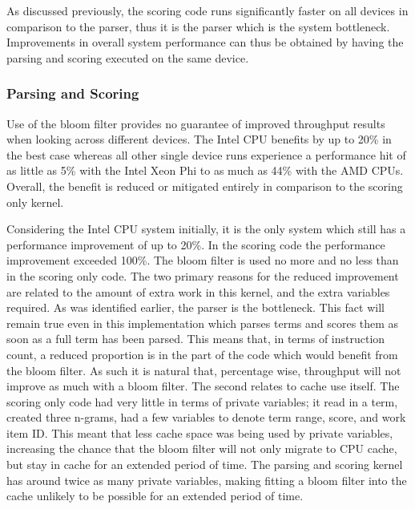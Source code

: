 As discussed previously, the scoring code runs significantly faster on all
devices in comparison to the parser, thus it is the parser which is the system
bottleneck. Improvements in overall system performance can thus be obtained by
having the parsing and scoring executed on the same device.

\subsubsection{Parsing and Scoring}

Use of the bloom filter provides no guarantee of improved throughput results
when looking across different devices. The Intel CPU benefits by up to 20\% in
the best case whereas all other single device runs experience a performance hit
of as little as 5\% with the Intel Xeon Phi to as much as 44\% with the AMD
CPUs. Overall, the benefit is reduced or mitigated entirely in comparison to the
scoring only kernel.

Considering the Intel CPU system initially, it is the only system which still
has a performance improvement of up to 20\%. In the scoring code the performance
improvement exceeded 100\%. The bloom filter is used no more and no less than in
the scoring only code. The two primary reasons for the reduced improvement are
related to the amount of extra work in this kernel, and the extra variables
required. As was identified earlier, the parser is the bottleneck. This fact
will remain true even in this implementation which parses terms and scores them
as soon as a full term has been parsed. This means that, in terms of instruction
count, a reduced proportion is in the part of the code which would benefit from
the bloom filter. As such it is natural that, percentage wise, throughput will
not improve as much with a bloom filter. The second relates to cache use itself.
The scoring only code had very little in terms of private variables; it read in
a term, created three n-grams, had a few variables to denote term range, score,
and work item ID. This meant that less cache space was being used by private
variables, increasing the chance that the bloom filter will not only migrate to
CPU cache, but stay in cache for an extended period of time. The parsing and
scoring kernel has around twice as many private variables, making fitting a
bloom filter into the cache unlikely to be possible for an extended period of
time.


